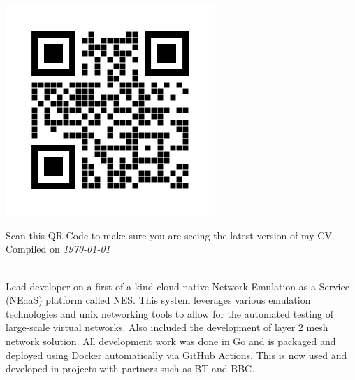 \documentclass[9pt]{developercv} %
\begin{document}
\begin{minipage}[t]{0.35\textwidth}
	\vspace{-\baselineskip} %
	\\
	\divider\\
	\begin{minipage}[t]{0.25\textwidth}
		\vspace{-\baselineskip} %
		\includegraphics[width=1\linewidth]{assets/websiteqr.png}
	\end{minipage}
	\hfill
	\begin{minipage}[t]{0.75\textwidth}
		\vspace{-\baselineskip} %
		Scan this QR Code to make sure you are seeing the latest version of my CV.\\
		Compiled on \textit{\today}\\
	\end{minipage}
\end{minipage}
\hfill
\begin{minipage}[t]{0.6\textwidth}
	\vspace{-\baselineskip} %
	\\
	Lead developer on a first of a kind cloud-native Network Emulation as a
	Service (NEaaS) platform called NES. This system leverages various emulation
	technologies and unix networking tools to allow for the automated testing of
	large-scale virtual networks. Also included the development of layer 2 mesh
	network solution. All development work was done in Go and is packaged and
	deployed using Docker automatically via GitHub Actions. This is now used and
	developed in projects with partners such as BT and BBC.
\end{minipage}

\end{document}
